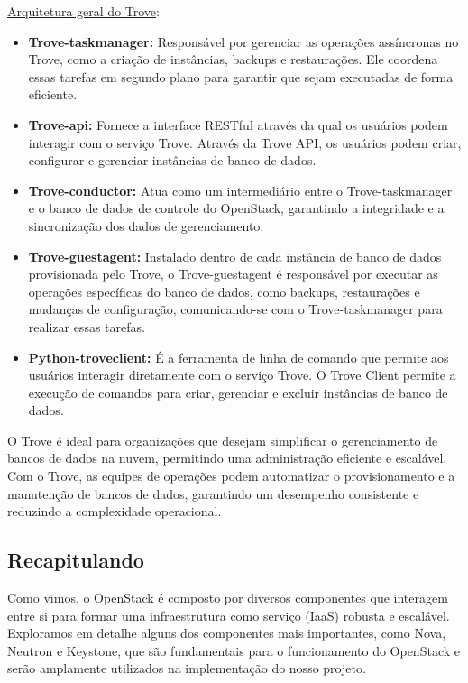 \href{https://docs.openstack.org/trove/latest/contributor/design.html}{Arquitetura geral do Trove}:

\begin{itemize}
    \item \textbf{Trove-taskmanager:} Responsável por gerenciar as operações assíncronas no Trove, como a criação de instâncias, backups e restaurações. Ele coordena essas tarefas em segundo plano para garantir que sejam executadas de forma eficiente.
    \item \textbf{Trove-api:} Fornece a interface RESTful através da qual os usuários podem interagir com o serviço Trove. Através da Trove API, os usuários podem criar, configurar e gerenciar instâncias de banco de dados.
    \item \textbf{Trove-conductor:} Atua como um intermediário entre o Trove-taskmanager e o banco de dados de controle do OpenStack, garantindo a integridade e a sincronização dos dados de gerenciamento.
    \item \textbf{Trove-guestagent:} Instalado dentro de cada instância de banco de dados provisionada pelo Trove, o Trove-guestagent é responsável por executar as operações específicas do banco de dados, como backups, restaurações e mudanças de configuração, comunicando-se com o Trove-taskmanager para realizar essas tarefas.
    \item \textbf{Python-troveclient:} É a ferramenta de linha de comando que permite aos usuários interagir diretamente com o serviço Trove. O Trove Client permite a execução de comandos para criar, gerenciar e excluir instâncias de banco de dados.
\end{itemize}

O Trove é ideal para organizações que desejam simplificar o gerenciamento de bancos de dados na nuvem, permitindo uma administração eficiente e escalável. Com o Trove, as equipes de operações podem automatizar o provisionamento e a manutenção de bancos de dados, garantindo um desempenho consistente e reduzindo a complexidade operacional.


\subsection{Recapitulando}

Como vimos, o OpenStack é composto por diversos componentes que interagem entre si para formar uma infraestrutura como serviço (IaaS) robusta e escalável. Exploramos em detalhe alguns dos componentes mais importantes, como Nova, Neutron e Keystone, que são fundamentais para o funcionamento do OpenStack e serão amplamente utilizados na implementação do nosso projeto.

